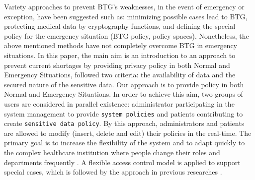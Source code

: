 \documentclass[conference]{IEEEtran}
\begin{document}
Variety approaches to prevent BTG's weaknesses, in the event of emergency or exception, have been suggested such as: minimizing possible cases lead to BTG, 
protecting medical data by cryptography functions, and defining the special policy for the emergency situation (BTG policy, policy spaces). 
Nonetheless, the above mentioned methods have not completely overcome BTG in emergency situations. 
In this paper, the main aim is an introduction to an approach to prevent current shortages by providing privacy policy in both Normal and Emergency Situations, followed two criteria: the availability of data and the secured nature of the sensitive data. 
Our approach is to provide policy in both Normal and Emergency Situations. 
In order to achieve this aim, two groups of users are considered in parallel existence: administrator participating in the system management to provide \texttt{system policies} and patients contributing to create \texttt{sensitive data policy}. 
By this approach, administrators and patients are allowed to modify (insert, delete and edit) their policies in the real-time.%
The primary goal is to increase the flexibility of the system and to adapt quickly to the complex healthcare institution where people change their roles and departments frequently \cite{ferreira2006break}.
A flexible access control model is applied to support special cases, which is followed by the approach in previous researches \cite{son2016rew,son2017rew}. 
\end{document}
